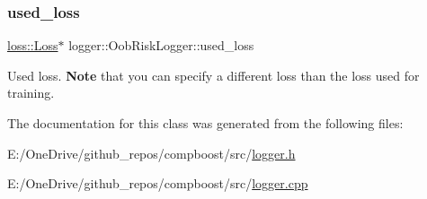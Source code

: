 \subsubsection{\texorpdfstring{used\+\_\+loss}{used\_loss}}
{\footnotesize\ttfamily \mbox{\hyperlink{classloss_1_1_loss}{loss\+::\+Loss}}$\ast$ logger\+::\+Oob\+Risk\+Logger\+::used\+\_\+loss\hspace{0.3cm}{\ttfamily [private]}}



Used loss. {\bfseries Note} that you can specify a different loss than the loss used for training. 



The documentation for this class was generated from the following files\+:\begin{DoxyCompactItemize}
\item 
E\+:/\+One\+Drive/github\+\_\+repos/compboost/src/\mbox{\hyperlink{logger_8h}{logger.\+h}}\item 
E\+:/\+One\+Drive/github\+\_\+repos/compboost/src/\mbox{\hyperlink{logger_8cpp}{logger.\+cpp}}\end{DoxyCompactItemize}
